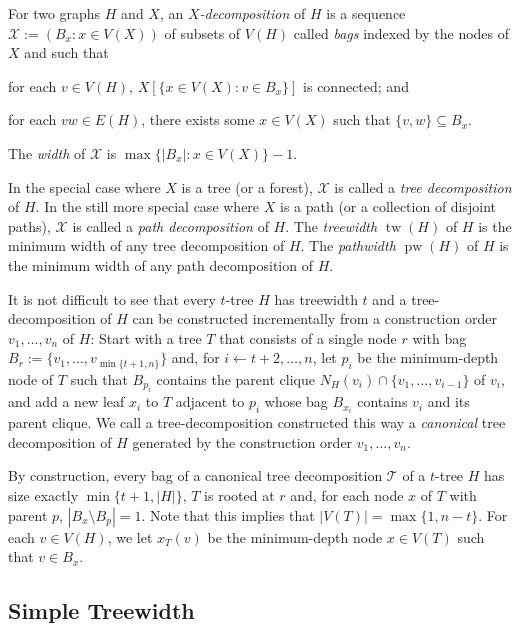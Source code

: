 \documentclass[kpfonts]{patmorin}
\DeclareMathOperator{\tw}{tw}
\DeclareMathOperator{\pw}{pw}
\theoremstyle{named}
\begin{document}
For two graphs $H$ and $X$, an \emph{$X$-decomposition} of $H$ is a sequence $\mathcal{X}:=(B_x:x\in V(X))$ of subsets of $V(H)$ called \emph{bags} indexed by the nodes of $X$ and such that
 \begin{inparaenum}[(i)]
     \item for each $v\in V(H)$, $X[\{x\in V(X):v\in B_x\}]$ is connected; and
     \item for each $vw\in E(H)$, there exists some $x\in V(X)$ such that $\{v,w\}\subseteq B_x$.
\end{inparaenum}
The \emph{width} of $\mathcal{X}$ is $\max\{|B_x|:x\in V(X)\}-1$.

In the special case where $X$ is a tree (or a forest), $\mathcal{X}$ is called a \emph{tree decomposition} of $H$.  In the still more special case where $X$ is a path (or a collection of disjoint paths), $\mathcal{X}$ is called a \emph{path decomposition} of $H$. The \emph{treewidth} $\tw(H)$ of $H$ is the minimum width of any tree decomposition of $H$. The \emph{pathwidth} $\pw(H)$ of $H$ is the minimum width of any path decomposition of $H$.

It is not difficult to see that every $t$-tree $H$ has treewidth $t$ and a tree-decomposition of $H$ can be constructed incrementally from a construction order $v_1,\ldots,v_n$ of $H$: Start with a tree $T$ that consists of a single node $r$ with bag $B_r:=\{v_1,\ldots,v_{\min\{t+1,n\}}\}$ and, for $i\gets t+2,\ldots,n$, let $p_i$ be the minimum-depth node of $T$ such that $B_{p_i}$ contains the parent clique $N_H(v_i)\cap\{v_1,\ldots,v_{i-1}\}$ of $v_i$, and add a new leaf $x_i$ to $T$ adjacent to $p_i$ whose bag $B_{x_i}$ contains $v_i$ and its parent clique.  We call a tree-decomposition constructed this way a \emph{canonical} tree decomposition of $H$ generated by the construction order $v_1,\ldots,v_n$.

By construction, every bag of a canonical tree decomposition $\mathcal{T}$ of a $t$-tree $H$ has size exactly $\min\{t+1,|H|\}$, $T$ is rooted at $r$ and, for each node $x$ of $T$ with parent $p$, $|B_x\setminus B_p|=1$.  Note that this implies that $|V(T)|=\max\{1,n-t\}$.
For each $v\in V(H)$, we let $x_T(v)$ be the minimum-depth node $x\in V(T)$ such that $v\in B_x$.

\subsection{Simple Treewidth}
\end{document}
